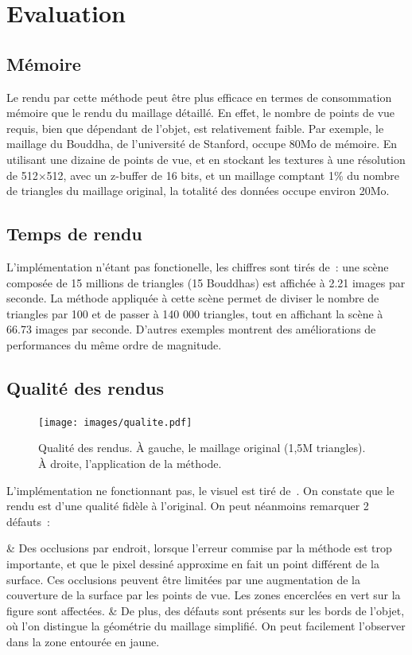 \section{Evaluation}
\subsection{Mémoire}
Le rendu par cette méthode peut être plus efficace en termes de consommation mémoire que le rendu du maillage détaillé. En effet, le nombre de points
de vue requis, bien que dépendant de l'objet, est relativement faible. Par exemple, le maillage du Bouddha, de l'université de Stanford, occupe 80Mo de mémoire.
En utilisant une dizaine de points de vue, et en stockant les textures à une résolution de 512$\times$512, avec un z-buffer de 16 bits, et un maillage
comptant 1\% du nombre de triangles du maillage original, la totalité des données occupe environ 20Mo.

\subsection{Temps de rendu}
L'implémentation n'étant pas fonctionelle, les chiffres sont tirés de~\cite{SG05}: une scène composée de 15 millions de triangles (15 Bouddhas) est affichée
à 2.21 images par seconde. La méthode appliquée à cette scène permet de diviser le nombre de triangles par 100 et de passer à 140 000 triangles, tout en
affichant la scène à 66.73 images par seconde. D'autres exemples montrent des améliorations de performances du même ordre de magnitude.

\subsection{Qualité des rendus}
\begin{figure}\label{fig:qualite}
    \centering
    \caption{Qualité des rendus. \`A gauche, le maillage original (1,5M triangles). \`A droite, l'application de la méthode.}
    \texttt{[image: images/qualite.pdf]}
\end{figure}
L'implémentation ne fonctionnant pas, le visuel est tiré de~\cite{SG05}. On constate que le rendu est d'une qualité fidèle à l'original.
On peut néanmoins remarquer 2 défauts~:
\begin{easylist}[itemize]
& Des occlusions par endroit, lorsque l'erreur commise par la méthode est trop importante, et que le pixel dessiné approxime
en fait un point différent de la surface. Ces occlusions peuvent être limitées par une augmentation de la couverture de la
surface par les points de vue. Les zones encerclées en vert sur la figure sont affectées.
& De plus, des défauts sont présents sur les bords de l'objet, où l'on distingue la géométrie du maillage simplifié. On peut
facilement l'observer dans la zone entourée en jaune.
\end{easylist}

